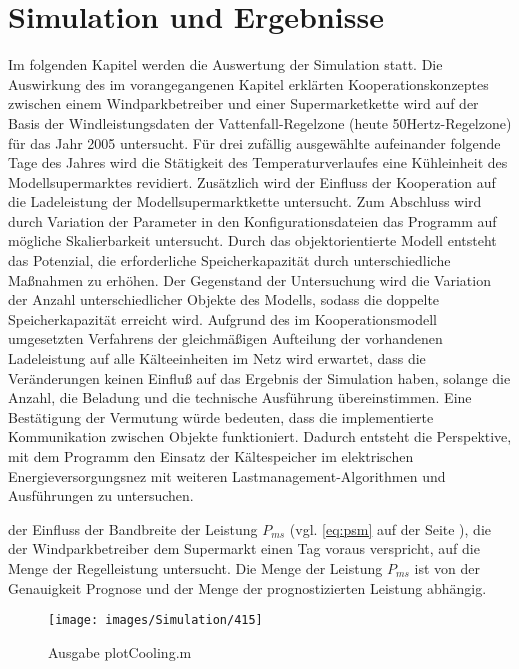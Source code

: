 \chapter{Simulation und Ergebnisse}
\minitoc
\label{chp:sue}
Im folgenden Kapitel werden die Auswertung der Simulation statt. Die Auswirkung
des im vorangegangenen Kapitel erkl\"arten Kooperationskonzeptes zwischen einem
Windparkbetreiber und einer Supermarketkette wird auf der Basis der
Windleistungsdaten der Vattenfall-Regelzone (heute 50Hertz-Regelzone) f\"ur das
Jahr 2005 untersucht. F\"ur drei zuf\"allig ausgew\"ahlte aufeinander folgende
Tage des Jahres wird die St\"atigkeit des Temperaturverlaufes eine K\"uhleinheit
des Modellsupermarktes revidiert. Zus\"atzlich wird der Einfluss der
Kooperation auf die Ladeleistung der Modellsupermarktkette untersucht. Zum
Abschluss wird durch Variation der Parameter in den Konfigurationsdateien das
Programm auf m\"ogliche Skalierbarkeit untersucht. Durch das objektorientierte
Modell entsteht das Potenzial, die erforderliche Speicherkapazit\"at durch
unterschiedliche Ma\ss nahmen zu erh\"ohen. Der Gegenstand der Untersuchung wird
die Variation der Anzahl unterschiedlicher Objekte des Modells, sodass die
doppelte Speicherkapazit\"at erreicht wird. Aufgrund des im Kooperationsmodell
umgesetzten Verfahrens der gleichm\"a\ss igen Aufteilung der vorhandenen
Ladeleistung auf alle K\"alteeinheiten im Netz wird erwartet, dass die
Ver\"anderungen keinen Einflu\ss $ $ auf das Ergebnis der Simulation haben,
solange die Anzahl, die Beladung und die technische Ausf\"uhrung
\"ubereinstimmen. Eine Best\"atigung der Vermutung w\"urde bedeuten, dass die
implementierte Kommunikation zwischen Objekte funktioniert. Dadurch entsteht die
Perspektive, mit dem Programm den Einsatz der K\"altespeicher im elektrischen
Energieversorgungsnez mit weiteren Lastmanagement-Algorithmen und Ausf\"uhrungen
zu untersuchen.

der Einfluss der Bandbreite der Leistung $P_{ms}$ (vgl.
\cref{eq:psm} auf der Seite \pageref{eq:psm}), die der Windparkbetreiber dem
Supermarkt einen Tag voraus verspricht, auf die Menge der Regelleistung
untersucht. Die Menge der Leistung $P_{ms}$ ist von der Genauigkeit Prognose und
der Menge der prognostizierten Leistung abh\"angig.



\begin{figure}[h]
	\begin{center}
	\texttt{[image: images/Simulation/415]}
	\end{center}
\caption{Ausgabe plotCooling.m}
\label{fig:ausgabe}
\end{figure}

